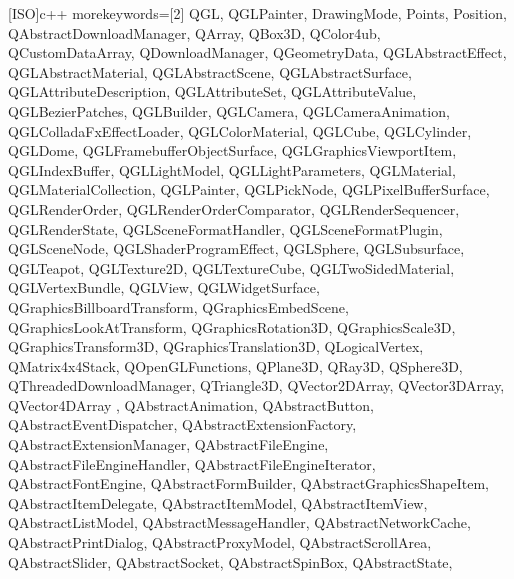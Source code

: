 [ISO]{c++}
{
    morekeywords=[2]{
        QGL,
        QGLPainter,
        DrawingMode,
        Points,
        Position,
        QAbstractDownloadManager,
        QArray,
        QBox3D,
        QColor4ub,
        QCustomDataArray,
        QDownloadManager,
        QGeometryData,
        QGLAbstractEffect,
        QGLAbstractMaterial,
        QGLAbstractScene,
        QGLAbstractSurface,
        QGLAttributeDescription,
        QGLAttributeSet,
        QGLAttributeValue,
        QGLBezierPatches,
        QGLBuilder,
        QGLCamera,
        QGLCameraAnimation,
        QGLColladaFxEffectLoader,
        QGLColorMaterial,
        QGLCube,
        QGLCylinder,
        QGLDome,
        QGLFramebufferObjectSurface,
        QGLGraphicsViewportItem,
        QGLIndexBuffer,
        QGLLightModel,
        QGLLightParameters,
        QGLMaterial,
        QGLMaterialCollection,
        QGLPainter,
        QGLPickNode,
        QGLPixelBufferSurface,
        QGLRenderOrder,
        QGLRenderOrderComparator,
        QGLRenderSequencer,
        QGLRenderState,
        QGLSceneFormatHandler,
        QGLSceneFormatPlugin,
        QGLSceneNode,
        QGLShaderProgramEffect,
        QGLSphere,
        QGLSubsurface,
        QGLTeapot,
        QGLTexture2D,
        QGLTextureCube,
        QGLTwoSidedMaterial,
        QGLVertexBundle,
        QGLView,
        QGLWidgetSurface,
        QGraphicsBillboardTransform,
        QGraphicsEmbedScene,
        QGraphicsLookAtTransform,
        QGraphicsRotation3D,
        QGraphicsScale3D,
        QGraphicsTransform3D,
        QGraphicsTranslation3D,
        QLogicalVertex,
        QMatrix4x4Stack,
        QOpenGLFunctions,
        QPlane3D,
        QRay3D,
        QSphere3D,
        QThreadedDownloadManager,
        QTriangle3D,
        QVector2DArray,
        QVector3DArray,
        QVector4DArray ,
        QAbstractAnimation,
        QAbstractButton,
        QAbstractEventDispatcher,
        QAbstractExtensionFactory,
        QAbstractExtensionManager,
        QAbstractFileEngine,
        QAbstractFileEngineHandler,
        QAbstractFileEngineIterator,
        QAbstractFontEngine,
        QAbstractFormBuilder,
        QAbstractGraphicsShapeItem,
        QAbstractItemDelegate,
        QAbstractItemModel,
        QAbstractItemView,
        QAbstractListModel,
        QAbstractMessageHandler,
        QAbstractNetworkCache,
        QAbstractPrintDialog,
        QAbstractProxyModel,
        QAbstractScrollArea,
        QAbstractSlider,
        QAbstractSocket,
        QAbstractSpinBox,
        QAbstractState,
}}
